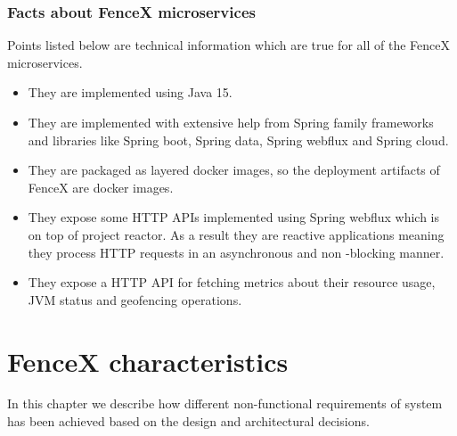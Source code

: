 \documentclass[a4]{report}
\begin{document}
    \subsection{Facts about FenceX microservices}
    Points listed below are technical information which are true for all of the FenceX microservices.

    \begin{itemize}
        \item They are implemented using Java 15.
        \item They are implemented with extensive help from Spring family frameworks and libraries like Spring boot,
        Spring data, Spring webflux and Spring cloud.
        \item They are packaged as layered docker images, so the deployment artifacts of FenceX are docker images.
        \item They expose some HTTP APIs implemented using Spring webflux which is on top of project reactor.
        As a result they are reactive applications meaning they process HTTP requests in an asynchronous and non
        -blocking manner.
        \item They expose a HTTP API for fetching metrics about their resource usage, JVM status and geofencing
        operations.
    \end{itemize}
    

    \chapter{FenceX characteristics}
    In this chapter we describe how different non-functional requirements of system has been achieved based on the
    design and architectural decisions.
\end{document}
